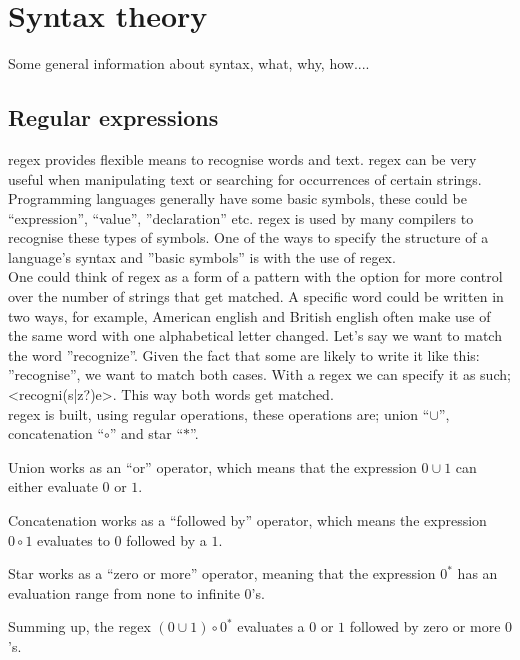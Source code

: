 \section{Syntax theory}
Some general information about syntax, what, why, how....
\subsection{Regular expressions}
\ac{regex} provides flexible means to recognise words and text. \ac{regex} can be very useful when manipulating text or searching for occurrences of certain strings.\\
Programming languages generally have some basic symbols, these could be ``expression'', ``value'', ''declaration'' etc. \ac{regex} is used by many compilers to recognise these types of symbols.
One of the ways to specify the structure of a language's syntax and ''basic symbols'' is with the use of \ac{regex}.\cite{Fischer2010}\\
One could think of \ac{regex} as a form of a pattern with the option for more control over the number of strings that get matched. A specific word could be written in two ways, for example, American english and British english often make use of the same word with one alphabetical letter changed. Let's say we want to match the word ''recognize''. Given the fact that some are likely to write it like this: ''recognise'', we want to match both cases. With a \ac{regex} we can specify it as such; <recogni(s|z?)e>. This way both words get matched.\\

\ac{regex} is built, using regular operations, these operations are; union ``$\cup$'', concatenation ``$\circ$'' and star ``$\ast$''.
\begin{description}
	\item Union works as an ``or'' operator, which means that the expression $0 \cup 1$ can either evaluate $0$ or $1$.
	\item Concatenation works as a ``followed by'' operator, which means the expression $0 \circ 1$ evaluates to $0$ followed by a $1$.
	\item Star works as a ``zero or more'' operator, meaning that the expression $0^{\ast}$ has an evaluation range from none to infinite $0$'s.
\end{description}
Summing up, the \ac{regex} $(0 \cup 1) \circ 0^{\ast}$ evaluates a $0$ or $1$ followed by zero or more $0$'s. \cite{syntax_book}\\

